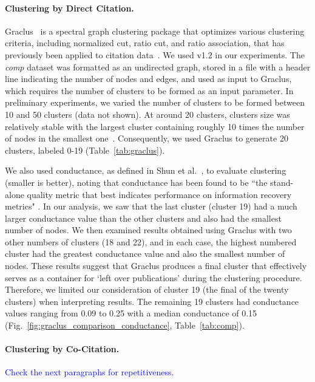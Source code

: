 \paragraph{Clustering by Direct Citation.} Graclus~\cite{graclus_2007} is a spectral graph clustering package that optimizes  various clustering criteria, including normalized cut, ratio cut, and ratio association, that has previously been applied to citation data~\cite{subelj_clustering_2016}. 
We used v1.2 in our experiments. 
The \emph{comp} dataset was formatted as an undirected graph, stored in a file with a header line indicating the number of nodes and edges, and used as input to Graclus, which requires the number of clusters to be formed as an input parameter. In preliminary experiments, we varied the number of clusters to be formed between 10 and 50 clusters (data not shown).  At around 20 clusters, clusters size was relatively stable with the largest cluster containing roughly 10 times the number of nodes in the smallest one~\cite{subelj_clustering_2016}. Consequently, we used Graclus to generate 20 clusters, labeled 0-19 (Table~\ref{tab:graclus}).




We also used conductance, as defined in Shun et al.~\cite{shun_parallel_2016}, to  evaluate clustering (smaller is better), noting that conductance has been found to be ``the stand-alone quality metric that best indicates performance on information recovery metrics" \cite{emmons2016analysis}. 
In our analysis, we saw that the last cluster (cluster 19) had a much larger conductance value than the other clusters and also had the smallest
number of nodes.
We then examined
results obtained using Graclus with two other numbers of clusters (18 and 22), and
in each case, the highest numbered cluster  had the greatest conductance value and also the smallest number of nodes.
These results suggest that Graclus produces a final cluster that effectively serves as a container for `left over publications' during the clustering procedure. 
Therefore, we limited our consideration of cluster 19 (the final of the twenty clusters)  when interpreting results.  The remaining 19 clusters had conductance values ranging from 0.09 to 0.25 with a median conductance of 0.15 (Fig.~\ref{fig:graclus_comparison_conductance}, Table~\ref{tab:comp}).

\paragraph{Clustering by Co-Citation.}
\textcolor{blue}{Check the next paragraphs for repetitiveness.}

